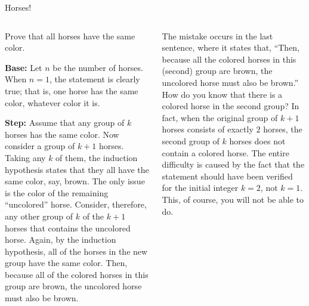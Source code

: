 \documentclass[9pt,aspectratio=169]{beamer}
\begin{document}
\begin{frame}{Horses!}
  \begin{columns}[T]
    \begin{column}{0.5\textwidth}
      \begin{problem}
        Prove that all horses have the same color.
      \end{problem}\pause
      \textbf{Base:} Let $n$ be the number of horses. When $n = 1$, the statement is clearly true; that is, one horse has the same color, whatever color it is. \pause
      
      \textbf{Step:} Assume that any group of $k$ horses has the same color. Now consider a group of $k + 1$ horses. Taking any $k$ of them, the induction hypothesis states that they all have the same color, say, brown. The only issue is the color of the remaining “uncolored” horse. Consider, therefore, any other group of $k$ of the $k+1$ horses that contains the uncolored horse. Again, by the induction hypothesis, all of the horses in the new group have the same color. Then, because all of the colored horses in this group are brown, the uncolored horse must also be brown.\pause
    \end{column}
    \begin{column}{0.5\textwidth}
      The mistake occurs in the last sentence, where it states that, “Then, because all the colored horses in this (second) group are brown, the uncolored horse must also be brown.” How do you know that there is a colored horse in the second group? In fact, when the original group of $k + 1$ horses consists of exactly $2$ horses, the second group of $k$ horses does not contain a colored horse. The entire difficulty is caused by the fact that the statement should have been verified for the initial integer $k = 2$, not $k = 1$. This, of course, you will not be able to do.
    \end{column}
  \end{columns}
\end{frame}
\end{document}
